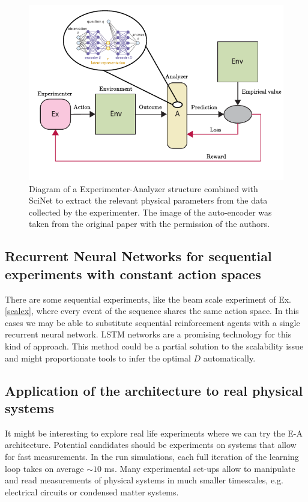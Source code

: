 \documentclass[11pt,a4paper,twoside]{report}
\newcommand{\+}{\textnormal{+} }
\theoremstyle{definition}
\numberwithin{equation}{chapter}
\begin{document}
\begin{figure}[t]
  \centering
  \includegraphics{figures/ScinetInEA.pdf}
  \caption{Diagram of a Experimenter-Analyzer structure combined with SciNet 
  to extract the relevant physical parameters from the data collected by the
  experimenter. The image of the auto-encoder was taken from the original paper
  \cite{iten2020discovering} with the permission of the authors.}
  \label{}
\end{figure}

\subsection{Recurrent Neural Networks for sequential experiments with constant 
action spaces}

There are some sequential experiments, like the beam scale experiment of Ex.
\ref{scalex}, where every event of the sequence shares the same action space. In
this cases we may be able to substitute sequential reinforcement agents with a
single recurrent neural network. LSTM networks \cite{LSTM} are a promising
technology for this kind of approach. This method could be a partial solution to
the scalability issue and might proportionate tools to infer the optimal $D$
automatically.

\subsection{Application of the architecture to real physical systems}

It might be interesting to explore real life experiments where we can try the
E-A architecture. Potential candidates should be experiments on systems that
allow for fast measurements. In the run simulations, each full iteration of
the learning loop takes on average $\sim 10$ ms. Many experimental set-ups allow
to manipulate and read measurements of physical systems in much smaller
timescales, e.g. electrical circuits or condensed matter systems.
\end{document}
